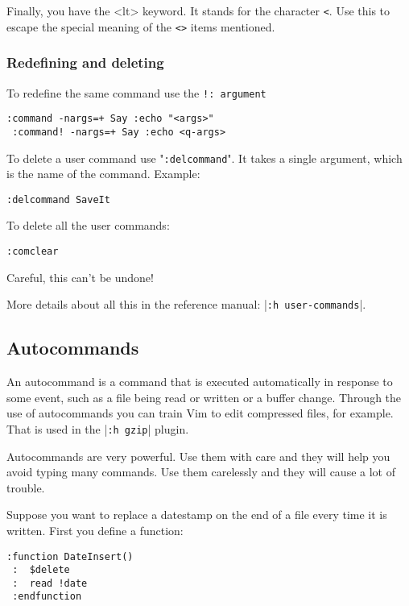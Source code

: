 {{Finally, you have the <lt> keyword.
It stands for the character \texttt{<}.
Use this to escape the special meaning of the \texttt{<>} items mentioned.

\subsubsection{Redefining and deleting}
To redefine the same command use the \texttt{!: argument}

\begin{Verbatim}[samepage=true]
 :command -nargs=+ Say :echo "<args>"
 :command! -nargs=+ Say :echo <q-args>
\end{Verbatim}

To delete a user command use "\texttt{:delcommand}".
It takes a single argument, which is the name of the command.
Example:

\begin{Verbatim}[samepage=true]
 :delcommand SaveIt
\end{Verbatim}

To delete all the user commands:

\begin{Verbatim}[samepage=true]
 :comclear
\end{Verbatim}

Careful, this can't be undone!

More details about all this in the reference manual: |\texttt{:h user-commands}|.
\subsection{Autocommands}
\label{Autocommands}
An autocommand is a command that is executed automatically in response to some event, such as a file being read or written or a buffer change.
Through the use of autocommands you can train Vim to edit compressed files, for example.
That is used in the |\texttt{:h gzip}| plugin.

Autocommands are very powerful.
Use them with care and they will help you avoid typing many commands.
Use them carelessly and they will cause a lot of trouble.

Suppose you want to replace a datestamp on the end of a file every time it is written.
First you define a function:

\begin{Verbatim}[samepage=true]
 :function DateInsert()
 :  $delete
 :  read !date
 :endfunction
\end{Verbatim}

}}
